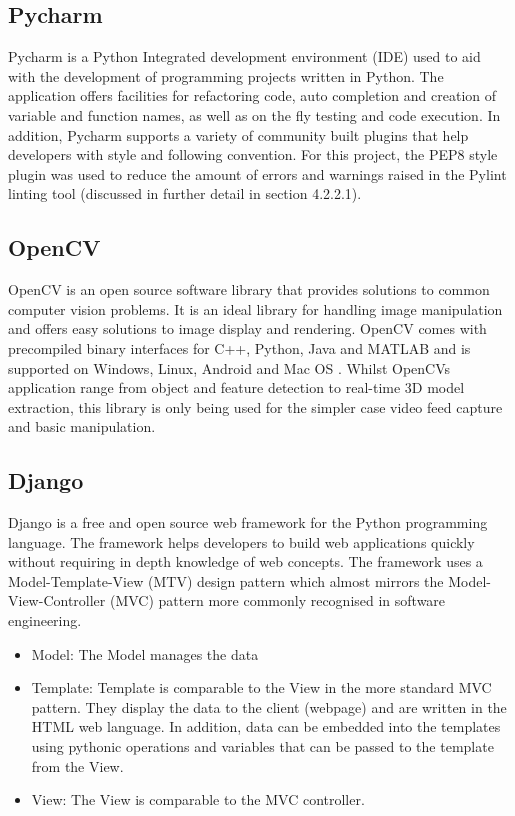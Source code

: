 \subsection{Pycharm}
Pycharm is a Python Integrated development environment (IDE) used to aid with the development of programming projects written in Python. The application offers facilities for refactoring code, auto completion and creation of variable and function names, as well as on the fly testing and code execution. In addition, Pycharm supports a variety of community built plugins that help developers with style and following convention. For this project, the PEP8 style plugin was used to reduce the amount of errors and warnings raised in the Pylint linting tool (discussed in further detail in section 4.2.2.1).

\subsection{OpenCV}
OpenCV is an open source software library that provides solutions to common computer vision problems. It is an ideal library for handling image manipulation and offers easy solutions to image display and rendering. OpenCV comes with precompiled binary interfaces for C++, Python, Java and MATLAB and is supported on Windows, Linux, Android and Mac OS \cite{open_cv_binaries}. Whilst OpenCVs application range from object and feature detection to real-time 3D model extraction, this library is only being used for the simpler case video feed capture and basic manipulation.

\subsection{Django}
Django is a free and open source web framework for the Python programming language. The framework helps developers to build web applications quickly without requiring in depth knowledge of web concepts. The framework uses a Model-Template-View (MTV) design pattern which almost mirrors the Model-View-Controller (MVC) pattern more commonly recognised in software engineering. 
\begin{itemize}
	\item Model: The Model manages the data
	
	\item Template: Template is comparable to the View in the more standard MVC pattern. They display the data to the client (webpage) and are written in the HTML web language.  In addition, data can be embedded into the templates using pythonic operations and variables that can be passed to the template from the View. 
	
	\item View: The View is comparable to the MVC controller. 
	
\end{itemize} 